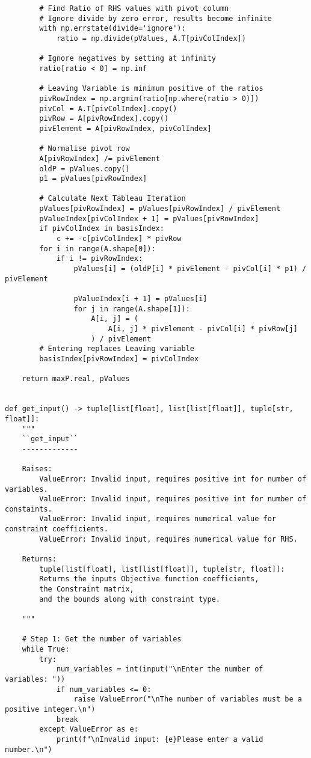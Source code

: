 \documentclass[letterpaper, a4paper]{article}
\begin{document}
\begin{verbatim}
        # Find Ratio of RHS values with pivot column
        # Ignore divide by zero error, results become infinite
        with np.errstate(divide='ignore'):
            ratio = np.divide(pValues, A.T[pivColIndex])

        # Ignore negatives by setting at infinity
        ratio[ratio < 0] = np.inf

        # Leaving Variable is minimum positive of the ratios
        pivRowIndex = np.argmin(ratio[np.where(ratio > 0)])
        pivCol = A.T[pivColIndex].copy()
        pivRow = A[pivRowIndex].copy()
        pivElement = A[pivRowIndex, pivColIndex]

        # Normalise pivot row
        A[pivRowIndex] /= pivElement
        oldP = pValues.copy()
        p1 = pValues[pivRowIndex]

        # Calculate Next Tableau Iteration
        pValues[pivRowIndex] = pValues[pivRowIndex] / pivElement
        pValueIndex[pivColIndex + 1] = pValues[pivRowIndex]
        if pivColIndex in basisIndex:
            c += -c[pivColIndex] * pivRow
        for i in range(A.shape[0]):
            if i != pivRowIndex:
                pValues[i] = (oldP[i] * pivElement - pivCol[i] * p1) / pivElement

                pValueIndex[i + 1] = pValues[i]
                for j in range(A.shape[1]):
                    A[i, j] = (
                        A[i, j] * pivElement - pivCol[i] * pivRow[j]
                    ) / pivElement
        # Entering replaces Leaving variable
        basisIndex[pivRowIndex] = pivColIndex

    return maxP.real, pValues


def get_input() -> tuple[list[float], list[list[float]], tuple[str, float]]:
    """
    ``get_input``
    -------------

    Raises:
        ValueError: Invalid input, requires positive int for number of variables.
        ValueError: Invalid input, requires positive int for number of constaints.
        ValueError: Invalid input, requires numerical value for constraint coefficients.
        ValueError: Invalid input, requires numerical value for RHS.

    Returns:
        tuple[list[float], list[list[float]], tuple[str, float]]:
        Returns the inputs Objective function coefficients,
        the Constraint matrix,
        and the bounds along with constraint type.

    """

    # Step 1: Get the number of variables
    while True:
        try:
            num_variables = int(input("\nEnter the number of variables: "))
            if num_variables <= 0:
                raise ValueError("\nThe number of variables must be a positive integer.\n")
            break
        except ValueError as e:
            print(f"\nInvalid input: {e}Please enter a valid number.\n")


\end{verbatim}
\end{document}
